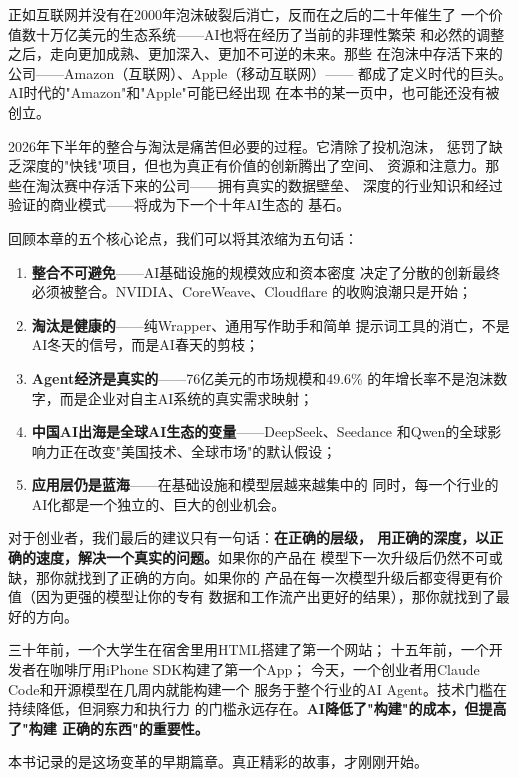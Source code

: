 正如互联网并没有在2000年泡沫破裂后消亡，反而在之后的二十年催生了
一个价值数十万亿美元的生态系统——AI也将在经历了当前的非理性繁荣
和必然的调整之后，走向更加成熟、更加深入、更加不可逆的未来。那些
在泡沫中存活下来的公司——Amazon（互联网）、Apple（移动互联网）——
都成了定义时代的巨头。AI时代的"Amazon"和"Apple"可能已经出现
在本书的某一页中，也可能还没有被创立。

2026年下半年的整合与淘汰是痛苦但必要的过程。它清除了投机泡沫，
惩罚了缺乏深度的"快钱"项目，但也为真正有价值的创新腾出了空间、
资源和注意力。那些在淘汰赛中存活下来的公司——拥有真实的数据壁垒、
深度的行业知识和经过验证的商业模式——将成为下一个十年AI生态的
基石。

回顾本章的五个核心论点，我们可以将其浓缩为五句话：

\begin{enumerate}
  \item \textbf{整合不可避免}——AI基础设施的规模效应和资本密度
    决定了分散的创新最终必须被整合。NVIDIA、CoreWeave、Cloudflare
    的收购浪潮只是开始；
  \item \textbf{淘汰是健康的}——纯Wrapper、通用写作助手和简单
    提示词工具的消亡，不是AI冬天的信号，而是AI春天的剪枝；
  \item \textbf{Agent经济是真实的}——76亿美元的市场规模和49.6\%
    的年增长率不是泡沫数字，而是企业对自主AI系统的真实需求映射；
  \item \textbf{中国AI出海是全球AI生态的变量}——DeepSeek、Seedance
    和Qwen的全球影响力正在改变"美国技术、全球市场"的默认假设；
  \item \textbf{应用层仍是蓝海}——在基础设施和模型层越来越集中的
    同时，每一个行业的AI化都是一个独立的、巨大的创业机会。
\end{enumerate}

对于创业者，我们最后的建议只有一句话：\textbf{在正确的层级，
用正确的深度，以正确的速度，解决一个真实的问题。}如果你的产品在
模型下一次升级后仍然不可或缺，那你就找到了正确的方向。如果你的
产品在每一次模型升级后都变得更有价值（因为更强的模型让你的专有
数据和工作流产出更好的结果），那你就找到了最好的方向。

三十年前，一个大学生在宿舍里用HTML搭建了第一个网站；
十五年前，一个开发者在咖啡厅用iPhone SDK构建了第一个App；
今天，一个创业者用Claude Code和开源模型在几周内就能构建一个
服务于整个行业的AI Agent。技术门槛在持续降低，但洞察力和执行力
的门槛永远存在。\textbf{AI降低了"构建"的成本，但提高了"构建
正确的东西"的重要性。}

本书记录的是这场变革的早期篇章。真正精彩的故事，才刚刚开始。
